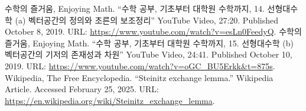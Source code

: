 \documentclass[11pt,openany]{article}
\begin{document}
\vfill
\begin{thebibliography}{9}
	수학의 즐거움, Enjoying Math. ``수학 공부, 기초부터 대학원 수학까지, 14. 선형대수학 (a) 벡터공간의 정의와 초른의 보조정리'' YouTube Video, 27:20. Published 
	October 8, 2019. URL: \url{https://www.youtube.com/watch?v=esLn0FeedyQ}.
	수학의 즐거움, Enjoying Math. ``수학 공부, 기초부터 대학원 수학까지, 15. 선형대수학 (b) 벡터공간의 기저의 존재성과 차원'' YouTube Video, 24:41. Published 
	October 10, 2019. URL: \url{https://www.youtube.com/watch?v=oGC_BU5Erkk&t=875s}.
	Wikipedia, The Free Encyclopedia. ``Steinitz exchange lemma.'' Wikipedia Article. Accessed February 25, 2025. URL: \url{https://en.wikipedia.org/wiki/Steinitz_exchange_lemma}.
\end{thebibliography}

%		
%		
%		
\end{document}
